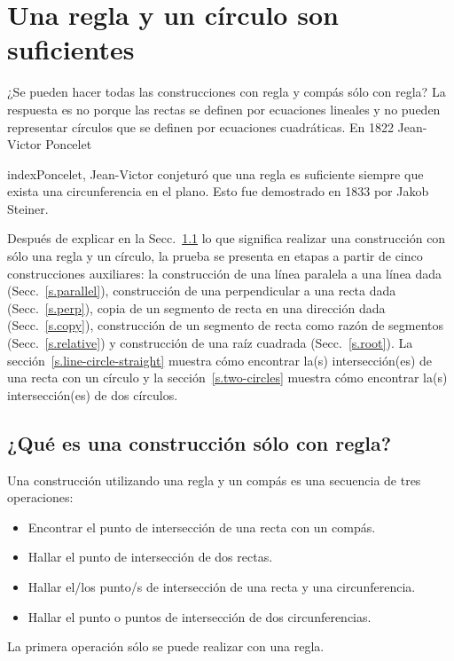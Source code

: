 
\chapter{Una regla y un círculo son suficientes}\label{c.straightedge}


¿Se pueden hacer todas las construcciones con regla y compás sólo con regla? La respuesta es no porque las rectas se definen por ecuaciones lineales y no pueden representar círculos que se definen por ecuaciones cuadráticas. En 1822 Jean-Victor Poncelet {index{Poncelet, Jean-Victor} conjeturó que una regla es suficiente siempre que exista una circunferencia en el plano. Esto fue demostrado en 1833 por Jakob Steiner.

Después de explicar en la Secc.~\ref{s.se-what} lo que significa realizar una construcción con sólo una regla y un círculo, la prueba se presenta en etapas a partir de cinco construcciones auxiliares: la construcción de una línea paralela a una línea dada (Secc.~\ref{s.parallel}), construcción de una perpendicular a una recta dada (Secc.~\ref{s.perp}), copia de un segmento de recta en una dirección dada (Secc.~\ref{s.copy}), construcción de un segmento de recta como razón de segmentos (Secc.~\ref{s.relative}) y construcción de una raíz cuadrada (Secc.~\ref{s.root}). La sección~\ref{s.line-circle-straight} muestra cómo encontrar la(s) intersección(es) de una recta con un círculo y la sección~\ref{s.two-circles} muestra cómo encontrar la(s) intersección(es) de dos círculos.

\section{¿Qué es una construcción sólo con regla?}\label{s.se-what}

Una construcción utilizando una regla y un compás es una secuencia de tres operaciones:
\begin{itemize}
\item Encontrar el punto de intersección de una recta con un compás.
\item Hallar el punto de intersección de dos rectas.
\item Hallar el/los punto/s de intersección de una recta y una circunferencia.
\item Hallar el punto o puntos de intersección de dos circunferencias.
\end{itemize}
La primera operación sólo se puede realizar con una regla.

}
